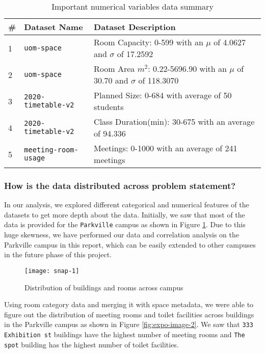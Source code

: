 \begin{table}[H]
\centering
\begin{tabular}{|l|l|l|}
\hline
\# & \textbf{Dataset Name} & \textbf{Dataset Description}                                           \\ \hline
1  & \texttt{uom-space}             &  Room Capacity: 0-599 with an $\mu$ of 4.0627 and $\sigma$ of 17.2592             \\ \hline
2  & \texttt{uom-space}             &  Room Area $m^2$: 0.22-5696.90 with an $\mu$ of 30.70 and $\sigma$ of 118.3070               \\ \hline                    
3  & \texttt{2020-timetable-v2}     & Planned Size: 0-684 with average of 50 students \\ \hline
4  & \texttt{2020-timetable-v2}     & Class Duration(min): 30-675 with an average of 94.336 \\ \hline
5  & \texttt{meeting-room-usage}    & Meetings: 0-1000 with an average of 241 meetings                                   \\ \hline
\end{tabular}
\caption{Important numerical variables data summary}
\end{table}

\subsubsection{How is the data distributed across problem statement?}

In our analysis, we explored different categorical and numerical features of the datasets to get more depth about the data. Initially, we saw that most of the data is provided for the \texttt{Parkville} campus as shown in Figure \ref{fig:expo-image-1}. Due to this huge skewness, we have performed our data and correlation analysis on the Parkville campus in this report, which can be easily extended to other campuses in the future phase of this project.

\begin{figure}[H]
\centering
\texttt{[image: snap-1]}
\caption{Distribution of buildings and rooms across campus}
\label{fig:expo-image-1}
\end{figure}

Using room category data and merging it with space metadata, we were able to figure out the distribution of meeting rooms and toilet facilities across buildings in the Parkville campus as shown in Figure \ref{fig:expo-image-2}. We saw that \texttt{333 Exhibition st} buildings have the highest number of meeting rooms and \texttt{The spot} building has the highest number of toilet facilities.

